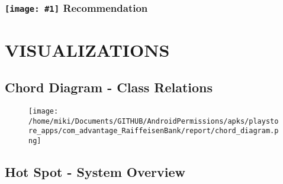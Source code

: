\documentclass[12p]{article}
\newcommand{\icon}[1]{\texttt{[image: \#1]}}
\begin{document}
\subsubsection*{\protect\icon{/home/miki/Documents/GITHUB/AndroidPermissions/python/vulns/report_icons/basic_todo.png} Recommendation}

\cleardoublepage
\newpage
\section{VISUALIZATIONS}
\subsection{Chord Diagram - Class Relations}
\begin{figure}[H]
	\texttt{[image: /home/miki/Documents/GITHUB/AndroidPermissions/apks/playstore\_apps/com\_advantage\_RaiffeisenBank/report/chord\_diagram.png]}\end{figure}\subsection{Hot Spot - System Overview}
\end{document}
